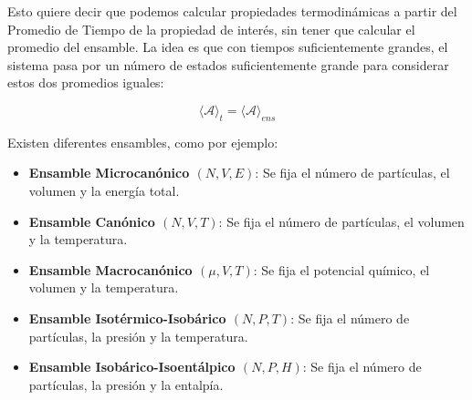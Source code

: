 
Esto quiere decir que podemos calcular propiedades termodinámicas a partir del Promedio de Tiempo de la propiedad de interés, sin tener que calcular el promedio del ensamble. La idea es que con tiempos suficientemente grandes, el sistema pasa por un número de estados suficientemente grande para considerar estos dos promedios iguales:

\begin{equation}
\langle \mathbf{\mathcal{A}} \rangle _{t} = \langle \mathbf{\mathcal{A}} \rangle _{ens}
\end{equation}

Existen diferentes ensambles, como por ejemplo:

\begin{itemize}
	\item \textbf{Ensamble Microcanónico $(N,V,E)$}: Se fija el número de partículas, el volumen y la energía total.
	\item \textbf{Ensamble Canónico $(N,V,T)$}: Se fija el número de partículas, el volumen y la temperatura.
	\item \textbf{Ensamble Macrocanónico $(\mu,V,T)$}: Se fija el potencial químico, el volumen y la temperatura.
	\item \textbf{Ensamble Isotérmico-Isobárico $(N,P,T)$}: Se fija el número de partículas, la presión y la temperatura.
	\item \textbf{Ensamble Isobárico-Isoentálpico $(N,P,H)$}: Se fija el número de partículas, la presión y la entalpía.
\end{itemize}

